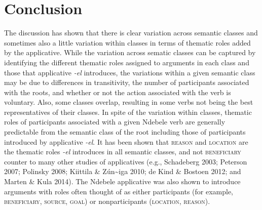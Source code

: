 \documentclass[output=paper]{langsci/langscibook}
\begin{document}
\section {Conclusion}

The discussion has shown that there is clear variation across semantic classes and sometimes also a little variation within classes in terms of thematic roles added by the applicative. While the variation across sematic classes can be captured by identifying the different thematic roles assigned to arguments in each class and those that applicative \textit{-el} introduces, the variations within a given semantic class may be due to differences in transitivity, the number of participants associated with the roots, and whether or not the action associated with the verb is voluntary. Also, some classes overlap, resulting in some verbs not being the best representatives of their classes. In spite of the variation within classes, thematic roles of participants associated with a given Ndebele verb are generally predictable from the semantic class of the root including those of participants introduced by applicative \textit{-el}. It has been shown that \textsc{reason} and \textsc{location} are the thematic roles \textit{-el} introduces in all semantic classes, and not \textsc{beneficiary} counter to many other studies of applicatives (e.g., Schadeberg 2003; Peterson 2007; Polinsky 2008; Kiittila \& Zún\~ {}iga 2010; de Kind \& Bostoen 2012; and Marten \& Kula 2014). The Ndebele applicative was also shown to introduce arguments with roles often thought of as either participants (for example, \textsc{beneficiary}, \textsc{source}, \textsc{goal}) or nonparticipants (\textsc{location}, \textsc{reason}). 
\end{document}
